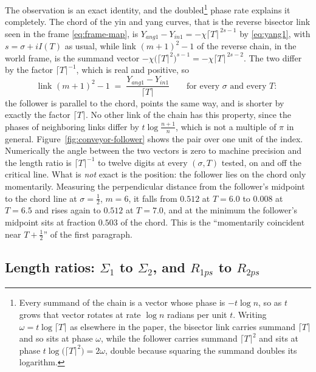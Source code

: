 \documentclass[11pt]{article}
\theoremstyle{definition}
\begin{document}
The observation is an exact identity, and the doubled\footnote{Every summand
of the chain is a vector whose phase is $-t\log n$, so as $t$ grows that
vector rotates at rate $\log n$ radians per unit $t$. Writing
$\omega=t\log\lceil T\rceil$ as elsewhere in the paper, the bisector link
carries summand $\lceil T\rceil$ and so sits at phase $\omega$, while the
follower carries summand $\lceil T\rceil^{2}$ and sits at phase
$t\log\bigl(\lceil T\rceil^{2}\bigr)=2\omega$, double because squaring the
summand doubles its logarithm.} phase rate explains it
completely. The chord of the yin and yang curves, that is the reverse bisector link
seen in the frame \eqref{eq:frame-map}, is
$Y_{ang1}-Y_{in1}=-\chi\lceil T\rceil^{\,2s-1}$ by \eqref{eq:yang1}, with
$s=\sigma+iI(T)$ as usual, while
link $(m+1)^{2}-1$ of the reverse chain, in the world frame, is the summand
vector $-\chi\bigl(\lceil T\rceil^{2}\bigr)^{s-1}=-\chi\lceil
T\rceil^{\,2s-2}$. The two differ by the factor $\lceil T\rceil^{-1}$, which
is real and positive, so
\begin{equation}\label{eq:follower-identity}
\text{link }(m+1)^2-1 \;=\; \frac{Y_{ang1}-Y_{in1}}{\lceil T\rceil}
\qquad\text{for every }\sigma\text{ and every }T:
\end{equation}
the follower is parallel to the chord, points the same way, and is shorter by
exactly the factor $\lceil T\rceil$. No other link of the chain has this
property, since the phases of neighboring links differ by
$t\log\frac{n+1}{n}$, which is not a multiple of $\pi$ in general.
Figure~\ref{fig:conveyor-follower} shows the pair over one unit of the index.
Numerically the angle between the two vectors is zero to machine precision and
the length ratio is $\lceil T\rceil^{-1}$ to twelve digits at every
$(\sigma,T)$ tested, on and off the critical line. What is \emph{not} exact is
the position: the follower lies on the chord only momentarily. Measuring the
perpendicular distance from the follower's midpoint to the chord line at
$\sigma=\tfrac12$, $m=6$, it falls from $0.512$ at $T=6.0$ to $0.008$ at
$T=6.5$ and rises again to $0.512$ at $T=7.0$, and at the minimum the
follower's midpoint sits at fraction $0.503$ of the chord. This is the
``momentarily coincident near $T+\tfrac12$'' of the first paragraph.

\subsection{\texorpdfstring{Length ratios: $\Sigma_1$ to $\Sigma_2$, and $R_{1ps}$ to $R_{2ps}$}{Length ratios}}\label{sec:length-ratios}
\end{document}
